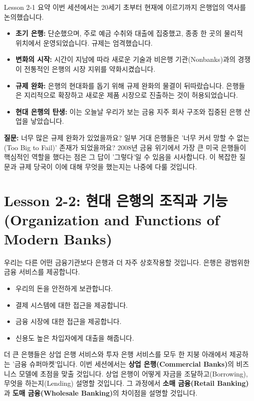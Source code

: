 \documentclass[11pt,a4paper]{article}
\begin{document}
\begin{summarybox}{Lesson 2-1 요약}
이번 세션에서는 20세기 초부터 현재에 이르기까지 은행업의 역사를 논의했습니다.
\begin{itemize}
    \item \textbf{초기 은행:} 단순했으며, 주로 예금 수취와 대출에 집중했고, 종종 한 곳의 물리적 위치에서 운영되었습니다. 규제는 엄격했습니다.
    \item \textbf{변화의 시작:} 시간이 지남에 따라 새로운 기술과 비은행 기관(Nonbanks)과의 경쟁이 전통적인 은행의 시장 지위를 약화시켰습니다.
    \item \textbf{규제 완화:} 은행의 현대화를 돕기 위해 규제 완화의 물결이 뒤따랐습니다. 은행들은 지리적으로 확장하고 새로운 제품 시장으로 진출하는 것이 허용되었습니다.
    \item \textbf{현대 은행의 탄생:} 이는 오늘날 우리가 보는 금융 지주 회사 구조와 집중된 은행 산업을 낳았습니다.
\end{itemize}
\textbf{질문:} 너무 많은 규제 완화가 있었을까요? 일부 거대 은행들은 '너무 커서 망할 수 없는(Too Big to Fail)' 존재가 되었을까요? 2008년 금융 위기에서 가장 큰 미국 은행들이 핵심적인 역할을 했다는 점은 그 답이 '그렇다'일 수 있음을 시사합니다. 이 복잡한 질문과 규제 당국이 이에 대해 무엇을 했는지는 나중에 다룰 것입니다.
\end{summarybox}

\newpage
\section{Lesson 2-2: 현대 은행의 조직과 기능 (Organization and Functions of Modern Banks)}

우리는 다른 어떤 금융기관보다 은행과 더 자주 상호작용할 것입니다. 은행은 광범위한 금융 서비스를 제공합니다.
\begin{itemize}
    \item 우리의 돈을 안전하게 보관합니다.
    \item 결제 시스템에 대한 접근을 제공합니다.
    \item 금융 시장에 대한 접근을 제공합니다.
    \item 신용도 높은 차입자에게 대출을 해줍니다.
\end{itemize}
더 큰 은행들은 상업 은행 서비스와 투자 은행 서비스를 모두 한 지붕 아래에서 제공하는 '금융 슈퍼마켓'입니다. 이번 세션에서는 \textbf{상업 은행(Commercial Banks)}의 비즈니스 모델에 초점을 맞출 것입니다. 상업 은행이 어떻게 자금을 조달하고(Borrowing), 무엇을 하는지(Lending) 설명할 것입니다. 그 과정에서 \textbf{소매 금융(Retail Banking)}과 \textbf{도매 금융(Wholesale Banking)}의 차이점을 설명할 것입니다.
\end{document}
